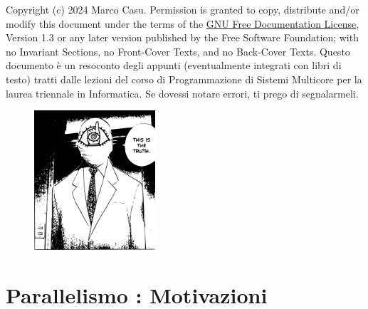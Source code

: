 \documentclass[10pt, letterpaper]{report}
\begin{document}
\newpage
\pagecolor{cartaRiciclata}%
\large
Copyright (c)  2024  Marco Casu.
    Permission is granted to copy, distribute and/or modify this document
    under the terms of the \color{blue}\href{https://www.gnu.org/licenses/fdl-1.3.txt}{GNU Free Documentation License}\color{black}, Version 1.3
    or any later version published by the Free Software Foundation;
    with no Invariant Sections, no Front-Cover Texts, and no Back-Cover Texts.
    \acc
Questo documento è un resoconto degli appunti (eventualmente integrati con libri di testo) tratti dalle lezioni del corso di Programmazione di Sistemi Multicore
\hphantom{a}per la laurea 
triennale in Informatica. Se dovessi notare errori, ti prego di segnalarmeli.
\vfill
\begin{figure}[h!]
    \raggedright
    \includegraphics[width=0.4\textwidth,right ]{../../../preamble/tomodachi.pdf} 
\end{figure}
\newpage %
\normalsize
\tableofcontents 
\newpage

\fancyhf{}
\fancyhead[L]{\nouppercase{\leftmark}}
\fancyfoot[C]{\thepage}



\chapter{Parallelismo : Motivazioni}
\end{document}

